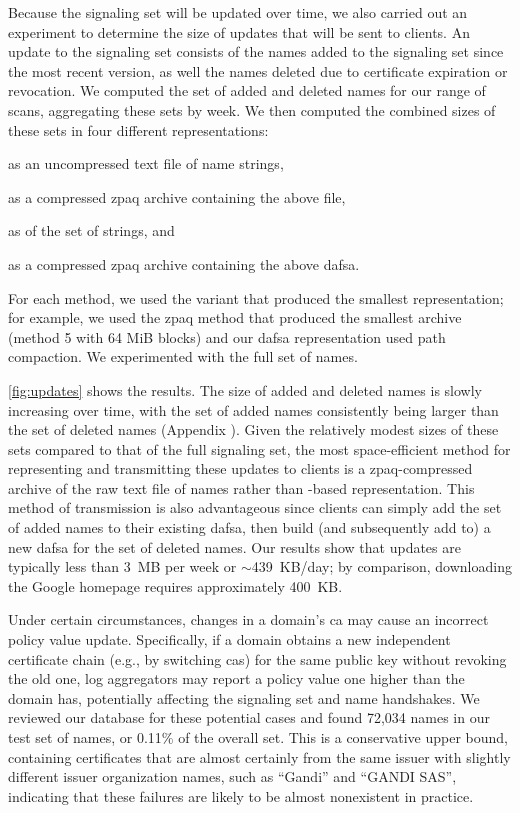 Because the signaling set will be updated over time, we also carried out an
experiment to determine the size of updates that will be sent to clients. An
update to the signaling set consists of the names added to the signaling set
since the most recent version, as well the names deleted due to certificate
expiration or revocation. We computed the set of added and deleted names for our
range of scans, aggregating these sets by week. We then computed the combined
sizes of these sets in four different representations:
\begin{inparaenum}[(1)]
\item as an uncompressed text file of name strings,
\item as a compressed zpaq archive containing the above file,
\item as  of the set of strings, and
\item as a compressed zpaq archive containing the above \ac{dafsa}.
\end{inparaenum}
For each method, we used the variant that produced the smallest representation;
for example, we used the zpaq method that produced the smallest archive (method
5 with 64 MiB blocks) and our \ac{dafsa} representation used path compaction.
We experimented with the full set of names.

\autoref{fig:updates} shows the results. The size of added and deleted names is
slowly increasing over time, with the set of added names consistently being
larger than the set of deleted names (Appendix ). Given the
relatively modest sizes of these sets compared to that of the full signaling
set, the most space-efficient method for representing and transmitting these
updates to clients is a zpaq-compressed archive of the raw text file of names
rather than -based representation. This method of transmission is
also advantageous since clients can simply add the set of added names to their
existing \ac{dafsa}, then build (and subsequently add to) a new \ac{dafsa} for
the set of deleted names. Our results show that updates are typically less than
3~MB per week or $\sim$439~KB/day; by comparison, downloading the Google
homepage requires approximately 400~KB.

Under certain circumstances, changes in a domain's \ac{ca} may cause an
incorrect policy value update. Specifically, if a domain obtains a new
independent certificate chain (e.g., by switching \acp{ca}) for the same public
key without revoking the old one, log aggregators may report a policy value one
higher than the domain has, potentially affecting the signaling set and
\ac{name} handshakes. We reviewed our database for these potential cases and
found 72,034 names in our test set of names, or 0.11\% of the overall set. This
is a conservative upper bound, containing certificates that are almost certainly
from the same issuer with slightly different issuer organization names, such as
``Gandi'' and ``GANDI SAS'', indicating that these failures are likely to be
almost nonexistent in practice.

